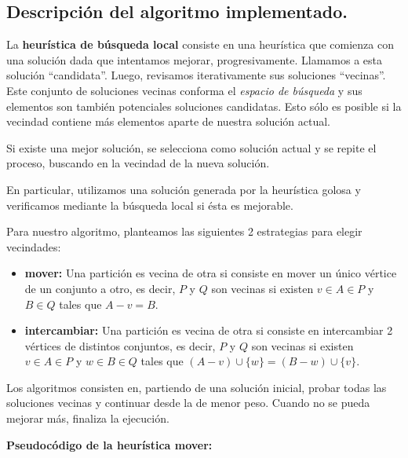 \subsection{Descripción del algoritmo implementado.}
\vspace*{0.3cm}

La \textbf{heurística de búsqueda local} consiste en una heurística que
comienza con una solución dada que intentamos mejorar, progresivamente. Llamamos a esta solución ``candidata''. Luego, revisamos iterativamente sus soluciones ``vecinas''. Este conjunto de soluciones vecinas conforma el
\textit{espacio de búsqueda} y sus elementos son también potenciales soluciones candidatas. Esto sólo es posible si la vecindad contiene más elementos aparte de nuestra solución actual.

Si existe una mejor solución, se selecciona como solución actual y se repite el proceso, buscando en la vecindad de la nueva solución.

En particular, utilizamos una solución generada por la heurística golosa y verificamos mediante la búsqueda local si ésta es mejorable.

\vspace*{0.3cm}

Para nuestro algoritmo, planteamos las siguientes 2 estrategias para elegir vecindades:

\begin{itemize}
    \item \textbf{mover:} Una partición es vecina de otra si consiste en mover un único vértice de un conjunto a otro, es decir, $P$ y $Q$ son vecinas si existen $v \in A \in P$ y $B \in Q$ tales que $A - v = B$.

    \item \textbf{intercambiar:} Una partición es vecina de otra si consiste en intercambiar 2 vértices de distintos conjuntos, es decir, $P$ y $Q$ son vecinas si existen $v \in A \in P$ y $w \in B \in Q$ tales que $(A - v) \cup \{w\} = (B - w) \cup \{v\}$.
\end{itemize}

Los algoritmos consisten en, partiendo de una solución inicial, probar todas las soluciones vecinas y continuar desde la de menor peso. Cuando no se pueda mejorar más, finaliza la ejecución.

\vspace*{0.75cm}

\textbf{Pseudocódigo de la heurística mover:}

\vspace*{0.3cm}

